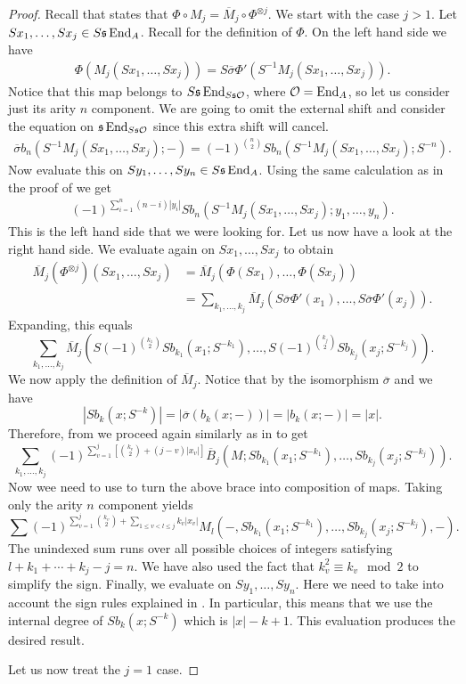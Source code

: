 \documentclass[Thesis.tex]{subfiles}
\begin{document}
\begin{proof}
Recall that  states that $\Phi\circ M_j = \overline{M}_j\circ \Phi^{\otimes j}$. We start with the case $j>1$. Let $Sx_1,\dots, Sx_j\in S\mathfrak{s}\operatorname{End}_A$. Recall  for the definition of $\Phi$. On the left hand side we have
\begin{align*}
\Phi(M_j(Sx_1,\dots, Sx_j)) = S\overline{\sigma}\Phi'(S^{-1}M_j(Sx_1,\dots, Sx_j)).
\end{align*}
Notice that this map belongs to $S\mathfrak{s}\operatorname{End}_{S\mathfrak{s}{\mathcal O}}$, where ${\mathcal O}=\operatorname{End}_A$, so let us consider just its arity $n$ component. We are going to omit the external shift and consider the equation on $\mathfrak{s}\operatorname{End}_{S\mathfrak{s}{\mathcal O}}$ since this extra shift will cancel.
\begin{align*}
\overline{\sigma}b_n(S^{-1}M_j(Sx_1,\dots, Sx_j);-)=(-1)^{\binom{n}{2}}Sb_n(S^{-1}M_j(Sx_1,\dots, Sx_j);S^{-n}).
\end{align*}
Now evaluate this on $Sy_1,\dots, Sy_n\in S\mathfrak{s}\operatorname{End}_A$. Using the same calculation as in the proof of  we get
\begin{align*}
(-1)^{\sum_{i=1}^n(n-i)|y_i|}Sb_n(S^{-1}M_j(Sx_1,\dots, Sx_j);y_1,\dots, y_n).
\end{align*}
This is the left hand side that we were looking for. Let us now have a look at the right hand side. We evaluate again on $Sx_1,\dots, Sx_j$ to obtain
\begin{align*}
\overline{M}_j(\Phi^{\otimes j})(Sx_1,\dots, Sx_j) & = \overline{M}_j(\Phi(Sx_1),\dots, \Phi(Sx_j))\\
&=\sum_{k_1,\dots, k_j}\overline{M}_j(S\overline{\sigma}\Phi'(x_1),\dots, S\overline{\sigma}\Phi'(x_j)).
\end{align*}
Expanding, this equals
\begin{equation}\label{intermediate}
\sum_{k_1,\dots, k_j}\overline{M}_j(S(-1)^{\binom{k_1}{2}}Sb_{k_1}(x_1;S^{-k_1}),\dots,S(-1)^{\binom{k_j}{2}}Sb_{k_j}(x_j;S^{-k_j}) ).
\end{equation}
We now apply the definition of $\overline{M}_j$. Notice that by the isomorphism $\overline{\sigma}$ and  we have
\[
|Sb_k(x;S^{-k})|=|\overline{\sigma}(b_k(x;-))|=|b_k(x;-)|=|x|.
\]
Therefore, from  we proceed again similarly as in  to get
\[
\sum_{k_1,\dots, k_j}(-1)^{\sum_{v=1}^j\left[\binom{k_v}{2}+(j-v)|x_v|\right]}\overline{B}_j(M;Sb_{k_1}(x_1;S^{-k_1}),\dots,Sb_{k_j}(x_j;S^{-k_j})).
\]
Now wee need to use  to turn the above brace into composition of maps. Taking only the arity $n$ component yields
\[
\sum(-1)^{\sum_{v=1}^j\binom{k_v}{2}+\underset{1\leq v<l\leq j}{\sum}k_v|x_v|}M_l(-,Sb_{k_1}(x_1;S^{-k_1}),\dots,Sb_{k_j}(x_j;S^{-k_j}),-).
\]
The unindexed sum runs over all possible choices of integers satisfying $l+k_1+\cdots+ k_j-j=n$. We have also used the fact that $k_v^2\equiv k_v\mod 2$ to simplify the sign. Finally, we evaluate on $Sy_1,\dots, Sy_n$. Here we need to take into account the sign rules explained in . In particular, this means that we use the internal degree of $Sb_k(x;S^{-k})$ which is $|x|-k+1$. This evaluation produces the desired result.

Let us now treat the $j=1$ case.
\end{proof}
\end{document}

